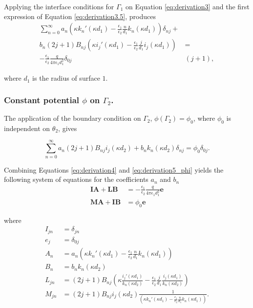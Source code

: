 Applying the interface conditions for $\Gamma_1$ on Equation \eqref{eq:derivation3} and the first expression of Equation \eqref{eq:derivation3.5}, produces
%
\begin{align}\label{eq:derivation4}
\sum_{n=0}^{\infty} a_n \left( \kappa k_{n}'(\kappa d_1) - \frac{\epsilon_1}{\epsilon_2} \frac{n}{d_1} k_n(\kappa d_1) \right) \delta_{nj} +& \nonumber \\ 
b_n (2j+1)B_{nj} \left( \kappa i_{j}'(\kappa d_1) - \frac{\epsilon_1}{\epsilon_2} \frac{j}{d_1} i_j(\kappa d_1)  \right) & = \nonumber \\
-\frac{\epsilon_1}{\epsilon_2} \frac{q}{4\pi\epsilon_1 d_1^2} \delta_{0j}&(j+1),
\end{align}

\noindent where $d_1$ is the radius of surface $1$.

\subsubsection*{Constant potential $\phi$ on $\Gamma_2$.}
The application of the boundary condition on $\Gamma_2$, $\phi(\Gamma_2) = \phi_0$, where $\phi_0$ is independent on $\theta_2$, gives

\begin{equation} \label{eq:derivation5_phi}
\sum_{n=0}^{\infty} a_n(2j+1)B_{nj}i_j(\kappa d_2) + b_nk_n(\kappa d_2) \delta_{nj} = \phi_0 \delta_{0j}.
\end{equation}

\noindent Combining Equations \eqref{eq:derivation4} and  \eqref{eq:derivation5_phi} yields the following system of equations for the coefficients $a_n$ and $b_n$
%
\begin{align} \label{eq:system_phi}
\mathbf{I} \mathbf{A} + \mathbf{L} \mathbf{B} &= -\frac{\epsilon_1}{\epsilon_2} \frac{q}{4\pi\epsilon_1 d_1^2} \mathbf{e} \nonumber \\
\mathbf{M} \mathbf{A} + \mathbf{I} \mathbf{B} &= \phi_0 \mathbf{e}
\end{align}

\noindent where
%
\begin{align} \label{eq:phi_terms}
I_{jn} &= \delta_{jn} \nonumber \\
e_j &= \delta_{0j} \nonumber \\
A_n &= a_n \left(\kappa k_n'(\kappa d_1) - \frac{\epsilon_1}{\epsilon_2} \frac{n}{d_1} k_n(\kappa d_1) \right) \nonumber \\
B_n &= b_n k_n(\kappa d_2) \nonumber \\
L_{jn} &= (2j+1)B_{nj}\left( \kappa \frac{i_j'(\kappa d_1)}{k_n(\kappa d_2)} - \frac{\epsilon_1}{\epsilon_2} \frac{j}{d_1} \frac{i_j(\kappa d_1)}{k_n(\kappa d_2)} \right) \nonumber \\
M_{jn} &= (2j+1)B_{nj} i_j(\kappa d_2) \frac{1}{\left(\kappa k_n'(\kappa d_1) - \frac{\epsilon_1}{\epsilon_2} \frac{n}{d_1} k_n(\kappa d_1) \right)}. 
\end{align}

